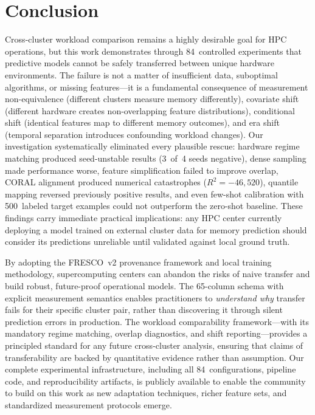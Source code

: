 \documentclass[sigconf]{acmart}
\begin{document}
\section{Conclusion}

Cross-cluster workload comparison remains a highly desirable goal for HPC operations, but this work demonstrates through 84~controlled experiments that predictive models cannot be safely transferred between unique hardware environments.
The failure is not a matter of insufficient data, suboptimal algorithms, or missing features---it is a fundamental consequence of measurement non-equivalence (different clusters measure memory differently), covariate shift (different hardware creates non-overlapping feature distributions), conditional shift (identical features map to different memory outcomes), and era shift (temporal separation introduces confounding workload changes).
Our investigation systematically eliminated every plausible rescue: hardware regime matching produced seed-unstable results (3~of~4 seeds negative), dense sampling made performance worse, feature simplification failed to improve overlap, CORAL alignment produced numerical catastrophes ($R^2 = -46{,}520$), quantile mapping reversed previously positive results, and even few-shot calibration with 500~labeled target examples could not outperform the zero-shot baseline.
These findings carry immediate practical implications: any HPC center currently deploying a model trained on external cluster data for memory prediction should consider its predictions unreliable until validated against local ground truth.

By adopting the FRESCO~v2 provenance framework and local training methodology, supercomputing centers can abandon the risks of naive transfer and build robust, future-proof operational models.
The 65-column schema with explicit measurement semantics enables practitioners to \emph{understand why} transfer fails for their specific cluster pair, rather than discovering it through silent prediction errors in production.
The workload comparability framework---with its mandatory regime matching, overlap diagnostics, and shift reporting---provides a principled standard for any future cross-cluster analysis, ensuring that claims of transferability are backed by quantitative evidence rather than assumption.
Our complete experimental infrastructure, including all 84~configurations, pipeline code, and reproducibility artifacts, is publicly available to enable the community to build on this work as new adaptation techniques, richer feature sets, and standardized measurement protocols emerge.
\end{document}
